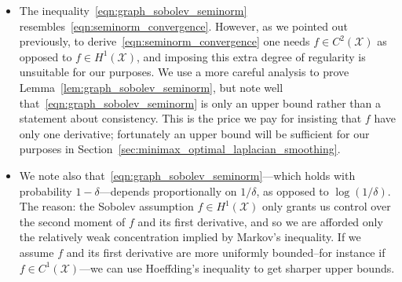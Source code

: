 \documentclass[twoside]{article}
\newcommand{\1}{\mathbf{1}}
\newcommand{\Xset}{\mathcal{X}}
\theoremstyle{definition}
\theoremstyle{remark}
\begin{document}
\begin{itemize}
	\item 
	The inequality~\eqref{eqn:graph_sobolev_seminorm} resembles~\eqref{eqn:seminorm_convergence}. However, as we pointed out previously, to derive~\eqref{eqn:seminorm_convergence} one needs $f \in C^{2}(\Xset)$ as opposed to $f \in H^1(\Xset)$, and imposing this extra degree of regularity is unsuitable for our purposes. We use a more careful analysis to prove Lemma~\ref{lem:graph_sobolev_seminorm}, but note well that~\eqref{eqn:graph_sobolev_seminorm} is only an upper bound rather than a statement about consistency. This is the price we pay for insisting that $f$ have only one derivative; fortunately an upper bound will be sufficient for our purposes in Section~\ref{sec:minimax_optimal_laplacian_smoothing}.
	\item We note also that~\eqref{eqn:graph_sobolev_seminorm}---which holds with probability $1 - \delta$---depends proportionally on $1/\delta$, as opposed to $\log(1/\delta)$. The reason: the Sobolev assumption $f \in H^1(\Xset)$ only grants us control over the second moment of $f$ and its first derivative, and so we are afforded only the relatively weak concentration implied by Markov's inequality. If we assume $f$ and its first derivative are more uniformly bounded--for instance if $f \in C^1(\Xset)$---we can use Hoeffding's inequality to get sharper upper bounds.
\end{itemize}
 
\end{document}
